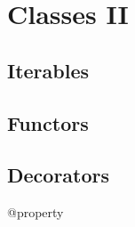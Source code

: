 \chapter{Classes II}
\label{chp:Classes2}

\section{Iterables}
\section{Functors}
\section{Decorators}
@property
